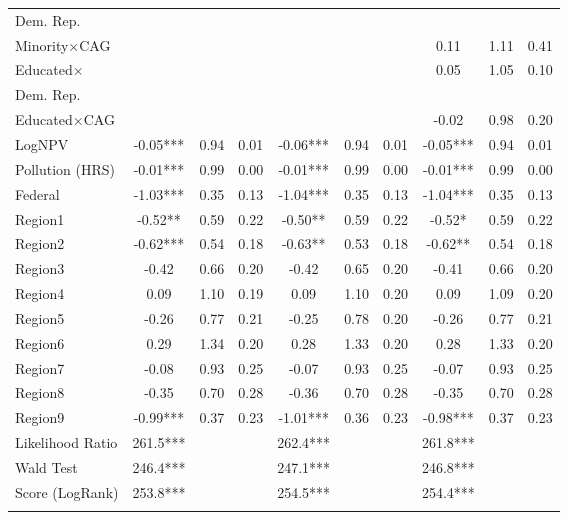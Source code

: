 \documentclass[12pt]{article}
\begin{document}
\begin{table}[H]
{\begin{tabular}{lccc|ccc|ccc}
			 \hspace{10pt}Dem. Rep. & & & & & & & & & \\
			Minority$\times$CAG &       &       &       &       &       &       &  {0.11} &  {1.11}  & {0.41} \\
			Educated$\times$ &       &       &       &       &       &       & \multirow{2}{*}{0.05} & \multirow{2}{*}{1.05}  & \multirow{2}{*}{0.10} \\
			\hspace{10pt}Dem. Rep. & & & & & & & & & \\
			Educated$\times$CAG &       &       &       &       &       &       &-0.02 & 0.98  & 0.20 \\
			LogNPV & -0.05*** & 0.94  & 0.01  & -0.06*** & 0.94  & 0.01  & -0.05*** & 0.94  & 0.01 \\
			Pollution (HRS)& -0.01*** & 0.99  & 0.00  & -0.01*** & 0.99  & 0.00  & -0.01*** & 0.99  & 0.00 \\
			Federal & -1.03*** & 0.35  & 0.13  & -1.04*** & 0.35  & 0.13  & -1.04*** & 0.35  & 0.13 \\
			Region1 & -0.52** & 0.59  & 0.22  & -0.50** & 0.59  & 0.22  & -0.52* & 0.59  & 0.22 \\
			Region2 & -0.62*** & 0.54  & 0.18  & -0.63** & 0.53  & 0.18  & -0.62** & 0.54  & 0.18 \\
			Region3 & -0.42 & 0.66  & 0.20  & -0.42 & 0.65  & 0.20  & -0.41 & 0.66  & 0.20 \\
			Region4 & 0.09  & 1.10  & 0.19  & 0.09  & 1.10  & 0.20  & 0.09  & 1.09  & 0.20 \\
			Region5 & -0.26 & 0.77  & 0.21  & -0.25 & 0.78  & 0.20  & -0.26 & 0.77  & 0.21 \\
			Region6 & 0.29  & 1.34  & 0.20  & 0.28  & 1.33  & 0.20  & 0.28  & 1.33  & 0.20 \\
			Region7 & -0.08 & 0.93  & 0.25  & -0.07 & 0.93  & 0.25  & -0.07 & 0.93  & 0.25 \\
			Region8 & -0.35 & 0.70  & 0.28  & -0.36 & 0.70  & 0.28  & -0.35 & 0.70  & 0.28 \\
			Region9 & -0.99*** & 0.37  & 0.23  & -1.01*** & 0.36  & 0.23  & -0.98*** & 0.37  & 0.23 \\						
			\hline 
		Likelihood Ratio & 261.5***  & & &
			262.4*** &  & &
			261.8*** & &\\ 
			Wald Test & 246.4*** & & &
			247.1*** & & &
			246.8*** & &\\
			Score (LogRank) & 253.8*** & & &
			254.5*** &  & &
			254.4*** & &\\
			\hline
			\addlinespace[1ex]
			\multicolumn{3}{l}{\textsuperscript{***}$p\leq0.001$, 
				\textsuperscript{**}$p\leq0.01$, 
				\textsuperscript{*}$p\leq0.05$}
	\end{tabular}}
\end{table}
\end{document}
